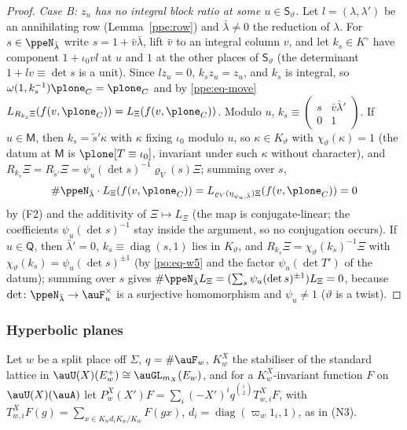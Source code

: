 \documentclass[10pt]{amsart}
\theoremstyle{definition}
\theoremstyle{remark}
\begin{document}
\begin{proof}
\emph{Case B: $z_u$ has no integral block ratio at some $u\in\mathsf S_\vartheta$.} Let
$l=(\lambda,\lambda')$ be an annihilating row (Lemma~\ref{ppe:row}) and $\bar\lambda\ne0$ the
reduction of $\lambda$. For $s\in\ppeN_{\bar\lambda}$ write $s=1+\bar v\bar\lambda$, lift $\bar v$
to an integral column $v$, and let $k_s\in K^\circ$ have component $1+\iota_0vl$ at $u$ and $1$ at
the other places of $\mathsf S_\vartheta$ (the determinant $1+lv\equiv\det s$ is a unit). Since
$lz_u=0$, $k_sz_u=z_u$, and $k_s$ is integral, so $\omega(1,k_s^{-1})\plone_C=\plone_C$ and by
\eqref{ppe:eq-move} $L_{R_{k_s}\Xi}(f(v,\plone_C))=L_\Xi(f(v,\plone_C))$. Modulo $u$,
$k_s\equiv\begin{pmatrix}s&\bar v\bar\lambda'\\0&1\end{pmatrix}$. If $u\in\mathsf M$, then
$k_s=\tilde s'\kappa$ with $\kappa$ fixing $\iota_0$ modulo $u$, so $\kappa\in K_\vartheta$ with
$\chi_\vartheta(\kappa)=1$ (the datum at $\mathsf M$ is $\plone[T\equiv\iota_0]$, invariant under
such $\kappa$ without character), and $R_{k_s}\Xi=R_{\tilde s'}\Xi=\psi_u(\det s)^{-1}
\varrho_V(s)\Xi$; summing over $s$,
\[
\#\ppeN_{\bar\lambda}\cdot L_\Xi(f(v,\plone_C))=L_{\varrho_V(\eta_{\psi_u,\bar\lambda})\Xi}
(f(v,\plone_C))=0
\]
by (F2) and the additivity of $\Xi\mapsto L_\Xi$ (the map is conjugate-linear; the coefficients $\psi_u(\det s)^{-1}$ stay inside the argument, so no conjugation occurs). If $u\in\mathsf Q$, then $\bar\lambda'=0$, $k_s\equiv
\operatorname{diag}(s,1)$ lies in $K_\vartheta$, and $R_{k_s}\Xi=\chi_\vartheta(k_s)^{-1}\Xi$ with
$\chi_\vartheta(k_s)=\psi_u(\det s)^{\pm1}$ (by \eqref{po:eq-w5} and the factor $\psi_u(\det T')$
of the datum); summing over $s$ gives $\#\ppeN_{\bar\lambda}L_\Xi=(\sum_s\psi_u(\det s)^{\pm1})
L_\Xi=0$, because $\det\colon\ppeN_{\bar\lambda}\to\auF_u^\times$ is a surjective homomorphism and
$\psi_u\ne1$ ($\vartheta$ is a twist).
\end{proof}

\subsubsection{Hyperbolic planes}\label{ppe:ss-planes}

Let $w$ be a split place off $\Sigma$, $q=\#\auF_w$, $K^X_w$ the stabiliser of the standard
lattice in $\auU(X)(E^+_w)\cong\auGL_{m_X}(E_w)$, and for a $K^X_w$-invariant function $F$ on
$\auU(X)(\auA)$ let $P^X_w(X')F=\sum_i(-X')^iq^{\binom i2}T^X_{w,i}F$, with $T^X_{w,i}F(g)=
\sum_{x\in K_wd_iK_w/K_w}F(gx)$, $d_i=\operatorname{diag}(\varpi_w1_i,1)$, as in (N3).
\end{document}
